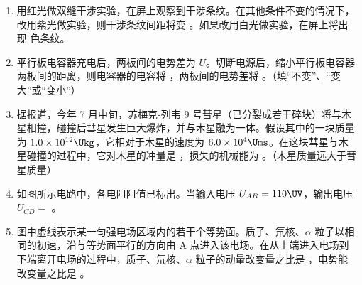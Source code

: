\documentclass[\gkver]{gaokaozhenti}
\begin{document}
\begin{enumerate}
\item
用红光做双缝干涉实验，在屏上观察到干涉条纹。在其他条件不变的情况下，改用紫光做实验，则干涉条纹间距将变 。如果改用白光做实验，在屏上将出现  色条纹。

\item
平行板电容器充电后，两板间的电势差为 $U$。切断电源后，缩小平行板电容器两板间的距离，则电容器的电容将 ，两板间的电势差将 。（填“不变”、“变大”或“变小”）

\item
据报道，今年 7 月中旬，苏梅克-列韦 9 号彗星（已分裂成若干碎块）将与木星相撞，碰撞后彗星发生巨大爆炸，并与木星融为一体。假设其中的一块质量为 $1.0\times10^{12}\Ukg$，它相对于木星的速度为 $6.0\times10^{4}\Ums$。在这块彗星与木星碰撞的过程中，它对木星的冲量是 ，损失的机械能为 。（木星质量远大于彗星质量）

\item
如图所示电路中，各电阻阻值已标出。当输入电压 $U_{AB} = 110\UV$，输出电压 $U_{CD} =$ \tkanswer[1.6cm]{$1\UV$}。
\onepicture[align=right, w=5.24cm]{}
\jdanswer{
$1\UV$
}

\item
图中虚线表示某一匀强电场区域内的若干个等势面。质子、氘核、$\alpha$ 粒子以相同的初速，沿与等势面平行的方向由 A 点进入该电场。在从上端进入电场到下端离开电场的过程中，质子、氘核、$\alpha$ 粒子的动量改变量之比是 ，电势能改变量之比是 。
\onepicture[align=right, h=3.65cm]{}


\end{enumerate}
\end{document}
